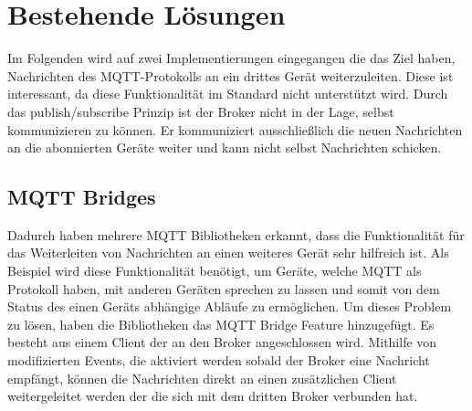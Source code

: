 
\section{Bestehende Lösungen}
    Im Folgenden wird auf zwei Implementierungen eingegangen die das Ziel haben, Nachrichten des \ac{MQTT}-Protokolls an ein drittes Gerät weiterzuleiten.
    Diese ist interessant, da diese Funktionalität im Standard \cite{gupta_banks_2015} nicht unterstützt wird. Durch das publish/subscribe Prinzip ist der Broker nicht in der Lage, selbst kommunizieren zu können. Er kommuniziert ausschließlich die neuen Nachrichten an die abonnierten Geräte weiter und kann nicht selbst Nachrichten schicken.
    
    \subsection{MQTT Bridges}
    Dadurch haben mehrere MQTT Bibliotheken \cite{84codes_ab_2016} \cite{light_2019} erkannt, dass die Funktionalität für das Weiterleiten von Nachrichten an einen weiteres Gerät sehr hilfreich ist. Als Beispiel wird diese Funktionalität benötigt, um Geräte, welche \ac{MQTT} als Protokoll haben, mit anderen Geräten sprechen zu lassen und somit von dem Status des einen Geräts abhängige Abläufe zu ermöglichen.
    Um dieses Problem zu lösen, haben die Bibliotheken das MQTT Bridge Feature hinzugefügt. Es besteht aus einem Client der an den Broker angeschlossen wird. Mithilfe von modifizierten Events, die aktiviert werden sobald der Broker eine Nachricht empfängt, können die Nachrichten direkt an einen zusätzlichen Client weitergeleitet werden der die sich mit dem dritten Broker verbunden hat.
    

